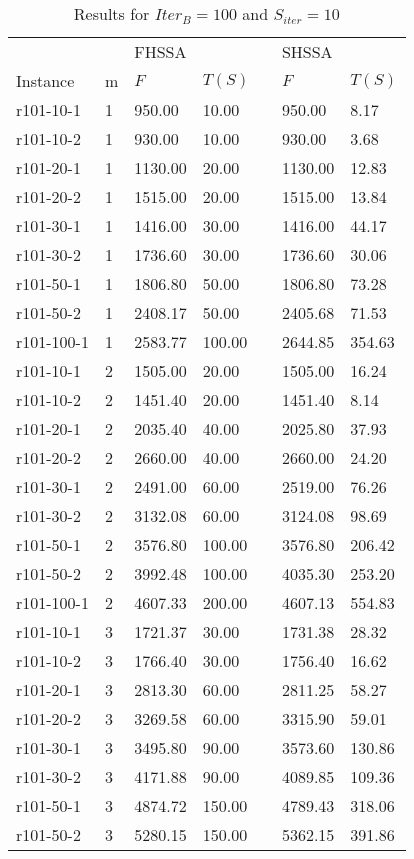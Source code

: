 \documentclass[final,5p,times,twocolumn]{elsarticle}
\begin{document}
{{{{{\renewcommand{\arraystretch}{1.2}
\begin{table}[htbp]
\centering
\caption{Results for $Iter_{B}=100$ and $S_{iter}=10$}
\centering
\begin{tabular}{l l l l l l l}
\hline 
&&\multicolumn{2}{l}{FHSSA}&& \multicolumn{2}{l}{SHSSA}\\
\cline{3-4}\cline{6-7}
Instance & m & $F$ & $T(S)$ && $F$ & $T(S)$\\
\hline
r101-10-1&1&950.00&10.00&&950.00&8.17\\
r101-10-2&1&930.00&10.00&&930.00&3.68\\
r101-20-1&1&1130.00&20.00&&1130.00&12.83\\
r101-20-2&1&1515.00&20.00&&1515.00&13.84\\
r101-30-1&1&1416.00&30.00&&1416.00&44.17\\
r101-30-2&1&1736.60&30.00&&1736.60&30.06\\
r101-50-1&1&1806.80&50.00&&1806.80&73.28\\
r101-50-2&1&2408.17&50.00&&2405.68&71.53\\
r101-100-1&1&2583.77&100.00&&2644.85&354.63\\
r101-10-1&2&1505.00&20.00&&1505.00&16.24\\
r101-10-2&2&1451.40&20.00&&1451.40&8.14\\
r101-20-1&2&2035.40&40.00&&2025.80&37.93\\
r101-20-2&2&2660.00&40.00&&2660.00&24.20\\
r101-30-1&2&2491.00&60.00&&2519.00&76.26\\
r101-30-2&2&3132.08&60.00&&3124.08&98.69\\
r101-50-1&2&3576.80&100.00&&3576.80&206.42\\
r101-50-2&2&3992.48&100.00&&4035.30&253.20\\
r101-100-1&2&4607.33&200.00&&4607.13&554.83\\
r101-10-1&3&1721.37&30.00&&1731.38&28.32\\
r101-10-2&3&1766.40&30.00&&1756.40&16.62\\
r101-20-1&3&2813.30&60.00&&2811.25&58.27\\
r101-20-2&3&3269.58&60.00&&3315.90&59.01\\
r101-30-1&3&3495.80&90.00&&3573.60&130.86\\
r101-30-2&3&4171.88&90.00&&4089.85&109.36\\
r101-50-1&3&4874.72&150.00&&4789.43&318.06\\
r101-50-2&3&5280.15&150.00&&5362.15&391.86\\

\end{tabular}
\end{table}}}}}}
\end{document}
